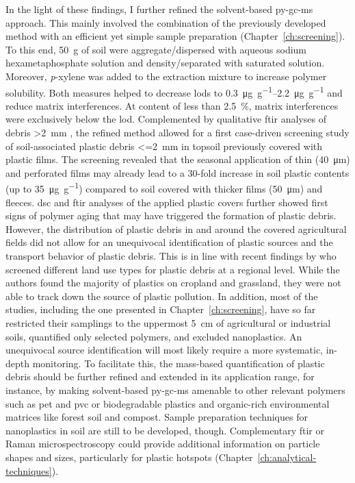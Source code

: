 In the light of these findings, I further refined the solvent-based \ac{py-gc-ms} approach. This mainly involved the combination of the previously developed method with an efficient yet simple sample preparation (Chapter~\ref{ch:screening}). To this end, \SI{50}{\gram} of soil were aggregate\-/dispersed with aqueous sodium hexametaphosphate solution and density\-/separated with saturated  solution. Moreover, \textit{p}-xylene was added to the extraction mixture to increase polymer solubility. Both measures helped to decrease \acp{lod} to \SIrange{0.3}{2.2}{\micro\gram\per\gram} and reduce matrix interferences. At  content of less than \SI{2.5}{\percent}, matrix interferences were exclusively below the \ac{lod}.
Complemented by qualitative \ac{ftir} analyses of debris \SI{>2}{\milli\meter} \citep{CowgerMicroplastic2021}, the refined method allowed for a first case-driven screening study of soil-associated plastic debris \SI{<=2}{\milli\meter} in topsoil previously covered with plastic films. The screening revealed that the seasonal application of thin (\SI{40}{\micro\meter}) and perforated films may already lead to a 30-fold increase in soil plastic contents (up to \SI{35}{\micro\gram\per\gram}) compared to soil covered with thicker films (\SI{50}{\micro\meter}) and fleeces. \Ac{dsc} and \ac{ftir} analyses of the applied plastic covers further showed first signs of polymer aging that may have triggered the formation of plastic debris. However, the distribution of plastic debris in and around the covered agricultural fields did not allow for an unequivocal identification of plastic sources and the transport behavior of plastic debris. This is in line with recent findings by \citet{CorradiniMicroplastics2021} who screened different land use types for plastic debris at a regional level. While the authors found the majority of plastics on cropland and grassland, they were not able to track down the source of plastic pollution. In addition, most of the studies, including the one presented in Chapter~\ref{ch:screening}, have so far restricted their samplings to the uppermost \SI{5}{\centi\meter} of agricultural or industrial soils, quantified only selected polymers, and excluded nanoplastics.
An unequivocal source identification will most likely require a more systematic, in-depth monitoring. To facilitate this, the mass-based quantification of plastic debris should be further refined and extended in its application range, for instance, by making solvent-based \ac{py-gc-ms} amenable to other relevant polymers such as \ac{pet} and \ac{pvc} or biodegradable plastics and organic-rich environmental matrices like forest soil and compost. Sample preparation techniques for nanoplastics in soil are still to be developed, though. Complementary \ac{ftir} or Raman microspectroscopy could provide additional information on particle shapes and sizes, particularly for plastic hotspots (Chapter~\ref{ch:analytical-techniques}).
